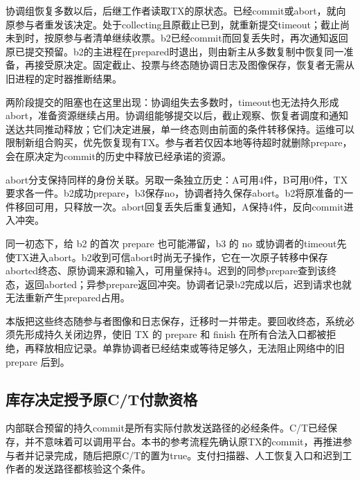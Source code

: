 
协调组恢复多数以后，后继工作者读取TX的原状态。已经commit或abort，就向原参与者重发该决定。处于collecting且原截止已到，就重新提交timeout；截止尚未到时，按原参与者清单继续收票。b2已经commit而回复丢失时，再次通知返回原已提交预留。b2的主进程在prepared时退出，则由新主从多数复制中恢复同一准备，再接受原决定。固定截止、投票与终态随协调日志及图像保存，恢复者无需从旧进程的定时器推断结果。

两阶段提交的阻塞也在这里出现：协调组失去多数时，timeout也无法持久形成abort，准备资源继续占用。协调组能够提交以后，截止观察、恢复者调度和通知送达共同推动释放；它们决定进展，单一终态则由前面的条件转移保持。运维可以限制新组合购买，优先恢复现有TX。参与者若仅因本地等待超时就删除prepare，会在原决定为commit的历史中释放已经承诺的资源。

abort分支保持同样的身份关联。另取一条独立历史：A可用4件，B可用0件，TX要求各一件。b2成功prepare，b3保存no，协调者持久保存abort。b2将原准备的一件移回可用，只释放一次。abort回复丢失后重复通知，A保持4件，反向commit进入冲突。

同一初态下，给 b2 的首次 prepare 也可能滞留，b3 的 no 或协调者的timeout先使TX进入abort。b2收到可信abort时尚无子操作，它在一次原子转移中保存aborted终态、原协调来源和输入，可用量保持4。迟到的同参prepare查到该终态，返回aborted；异参prepare返回冲突。协调者记录b2完成以后，迟到请求也就无法重新产生prepared占用。

本版把这些终态随参与者图像和日志保存，迁移时一并带走。要回收终态，系统必须先形成持久关闭边界，使旧 TX 的 prepare 和 finish 在所有合法入口都被拒绝，再释放相应记录。单靠协调者已经结束或等待足够久，无法阻止网络中的旧 prepare 后到。


\subsection{库存决定授予原C/T付款资格}

内部联合预留的持久commit是所有实际付款发送路径的必经条件。C/T已经保存，并不意味着可以调用平台。本书的参考流程先确认原TX的commit，再推进参与者并记录完成，随后把原C/T的置为true。支付扫描器、人工恢复入口和迟到工作者的发送路径都核验这个条件。


